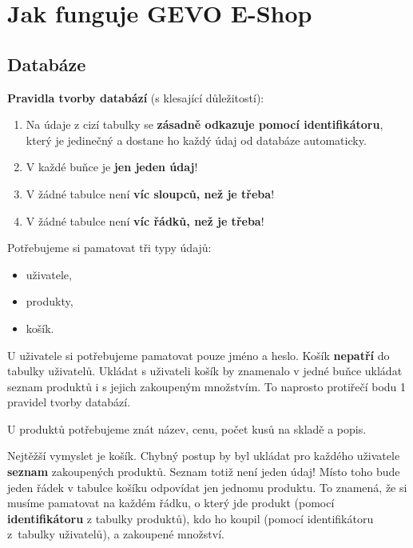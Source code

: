 \documentclass[a4paper,11pt]{article}
\begin{document}
\thispagestyle{fancy}

\section{Jak funguje GEVO E-Shop}
\label{sec:jak-funguje-e-shop}

\subsection{Databáze}
\label{ssec:databaze}

\textbf{Pravidla tvorby databází} (s klesající důležitostí):
\begin{enumerate}[topsep=0pt]
 \item Na údaje z cizí tabulky se \textbf{zásadně odkazuje pomocí
  identifikátoru}, který je jedinečný a dostane ho každý údaj od databáze
  automaticky.
 \item V každé buňce je \textbf{jen jeden údaj}!
 \item V žádné tabulce není \textbf{víc sloupců, než je třeba}!
 \item V žádné tabulce není \textbf{víc řádků, než je třeba}!
\end{enumerate}

Potřebujeme si pamatovat tři typy údajů:
\begin{itemize}[topsep=0pt]
 \item uživatele,
 \item produkty,
 \item košík.
\end{itemize}

U uživatele si potřebujeme pamatovat pouze jméno a heslo. Košík \textbf{nepatří}
do tabulky uživatelů. Ukládat s uživateli košík by znamenalo v jedné buňce
ukládat seznam produktů i s jejich za\-koupeným množstvím. To naprosto protiřečí
bodu 1 pravidel tvorby databází.

U produktů potřebujeme znát název, cenu, počet kusů na skladě a popis.

Nejtěžší vymyslet je košík. Chybný postup by byl ukládat pro každého uživatele
\textbf{seznam} za\-koupených produktů. Seznam totiž není jeden údaj! Místo toho
bude jeden řádek v tabulce košíku odpovídat jen jednomu produktu. To znamená, že
si musíme pamatovat na každém řádku, o který jde produkt (pomocí
\textbf{identifikátoru} z tabulky produktů), kdo ho koupil (pomocí
identifikátoru z~tabulky uživatelů), a zakoupené množství.
\end{document}
